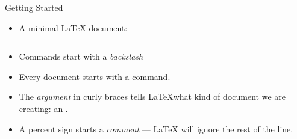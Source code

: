 \documentclass[10pt,times]{beamer}
\begin{document}

\begin{frame}[fragile]{Getting Started}
\begin{itemize}
\item A minimal \LaTeX{} document:
\inputminted[frame=single]{latex}{Hello.tex}
\item Commands start with a \emph{backslash} \keys{$\backslash$}
\item Every document starts with a  command.
\item The \emph{argument} in curly braces \keys{\{} \keys{\}} 
tells \LaTeX what kind of document we are creating: an .
\item A percent sign \keys{\%} starts a \emph{comment} --- \LaTeX
will ignore the rest of the line.

\end{itemize}
\end{frame}
\end{document}
